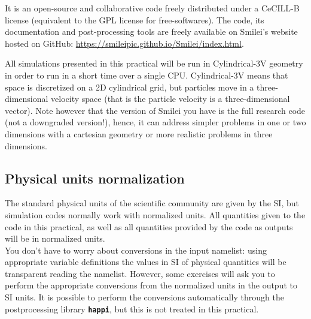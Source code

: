\documentclass[a4paper,12pt]{extarticle}
\newcommand{\smilei}{{\sc Smilei}\xspace}
\newcommand{\commandline}[1]{\texttt{\textbf{#1}}}
\begin{document}
It is an open-source and collaborative code freely distributed under a CeCILL-B license (equivalent to the GPL license for free-softwares).
The code, its documentation and post-processing tools are freely available on \smilei's website hosted on GitHub: \url{https://smileipic.github.io/Smilei/index.html}.

All simulations presented in this practical will be run in Cylindrical-3V geometry in order to run in a short time over a single CPU.
Cylindrical-3V means that space is discretized on a 2D cylindrical grid, but particles move in a three-dimensional velocity space (that is the particle velocity is a three-dimensional vector). Note however that the version of \smilei you have is the full research code (not a downgraded version!), hence, it can address simpler problems in one or two dimensions with a cartesian geometry or more realistic problems in three dimensions.


\subsection{Physical units normalization}\label{units}
The standard physical units of the scientific community are given by the SI,  but simulation codes normally  work with normalized units. All quantities given to the code in this practical, as well as all quantities provided by the code as outputs will be in normalized units.\\

You don't have to worry about conversions in the input namelist: using appropriate variable definitions the values in SI of physical quantities will be transparent reading the namelist.
However, some exercises will ask you to perform the appropriate conversions from the normalized units in the output to SI units.  It is possible to perform the conversions automatically through the postprocessing library \commandline{happi},  but this is not treated in this practical.
\end{document}
